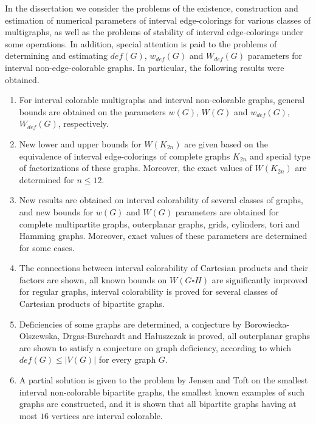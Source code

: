 In the dissertation we consider the problems of the existence, construction and estimation of numerical parameters of interval edge-colorings for various classes of multigraphs, as well as the problems of stability of interval edge-colorings under some operations. In addition, special attention is paid to the problems of determining and estimating $def(G)$, $w_{def}(G)$ and $W_{def}(G)$ parameters for interval non-edge-colorable graphs. In particular, the following results were obtained.

\begin{enumerate}
    \item For interval colorable multigraphs and interval non-colorable graphs, general bounds are obtained on the parameters $w(G)$, $W(G)$ and  $w_{def}(G)$, $W_{def}(G)$, respectively.

    \item New lower and upper bounds for $W(K_{2n})$ are given based on the equivalence of interval edge-colorings of complete graphs $K_{2n}$ and special type of factorizations of these graphs. Moreover, the exact values of $W(K_{2n})$ are determined for $n\leq 12$.
    
    \item New results are obtained on interval colorability of several classes of graphs, and new bounds for $w(G)$ and $W(G)$ parameters are obtained for complete multipartite graphs, outerplanar graphs, grids, cylinders, tori and Hamming graphs. Moreover, exact values of these parameters are determined for some cases.
    
    \item The connections between interval colorability of Cartesian products and their factors are shown, all known bounds on $W(G \square H)$ are significantly improved for regular graphs, interval colorability is proved for several classes of Cartesian products of bipartite graphs.
    
    \item Deficiencies of some graphs are determined, a conjecture by Borowiecka-Olszewska, Drgas-Burchardt and Ha\l uszczak is proved, all outerplanar graphs are shown to satisfy a conjecture on graph deficiency, according to which $def(G) \leq |V(G)|$ for every graph $G$.
    
    \item A partial solution is given to the problem by Jensen and Toft on the smallest interval non-colorable bipartite graphs, the smallest known examples of such graphs are constructed, and it is shown that all bipartite graphs having at most $16$ vertices are interval colorable.

\end{enumerate}